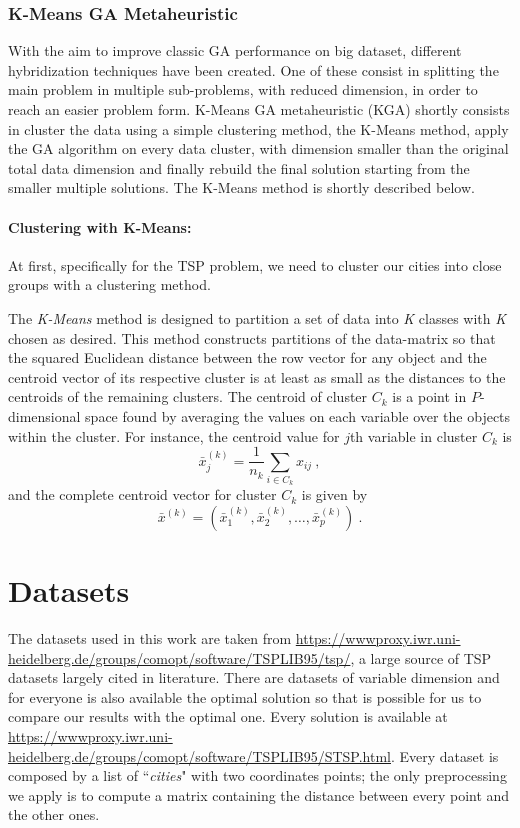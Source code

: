 \documentclass[10pt]{article}
\begin{document}
\subsubsection{K-Means GA Metaheuristic} \label{sec:KGA}
With the aim to improve classic GA performance on big dataset, 
different hybridization techniques have been created.
One of these consist in splitting the main problem in multiple sub-problems, with reduced dimension, in order to reach an easier problem form.
K-Means GA metaheuristic (KGA) shortly consists in cluster the data using a simple clustering method, the K-Means method, apply the GA algorithm on every data cluster, with dimension smaller than the original total data dimension and finally rebuild the final solution starting from the smaller multiple solutions.
The K-Means method is shortly described below.

\paragraph{Clustering with K-Means:} At first, specifically for the TSP problem, we need to cluster our cities into close groups with a clustering method.

The \textit{K-Means} method is designed to partition a set of data into \textit{K} classes with \textit{K} chosen as desired.
This method constructs partitions of the data-matrix so that the squared Euclidean distance between the row vector for any object and the centroid vector of its respective cluster is at least as small as the distances to the centroids of the remaining clusters.
The centroid of cluster $C_k$ is a point in $P$-dimensional space found by averaging the values on each variable over the objects within the cluster. For instance, the centroid value for $j$th variable in cluster $C_k$ is
\begin{equation}
\bar{x}_{j}^{(k)} = \frac{1}{n_k} \sum_{i \in C_k} x_{ij}~,
\end{equation}
and the complete centroid vector for cluster $C_k$ is given by \cite{ventidue}
\begin{equation}
\bar{x}^{(k)}  = (\bar{x}_1^{(k)},\bar{x}_2^{(k)},\dots,\bar{x}_p^{(k)})~.
\end{equation}
\section{Datasets}
The datasets used in this work are taken from  \url{https://wwwproxy.iwr.uni-heidelberg.de/groups/comopt/software/TSPLIB95/tsp/}, a large source of TSP datasets largely cited in literature. 
There are datasets of variable dimension and for everyone is also available the optimal solution so that is possible for us to compare our results with the optimal one. 
Every solution is available at \url{https://wwwproxy.iwr.uni-heidelberg.de/groups/comopt/software/TSPLIB95/STSP.html}. Every dataset is composed by a list of ``\textit{cities}" with two coordinates points; the only preprocessing we apply is to compute a matrix containing the distance between every point and the other ones.
\end{document}
